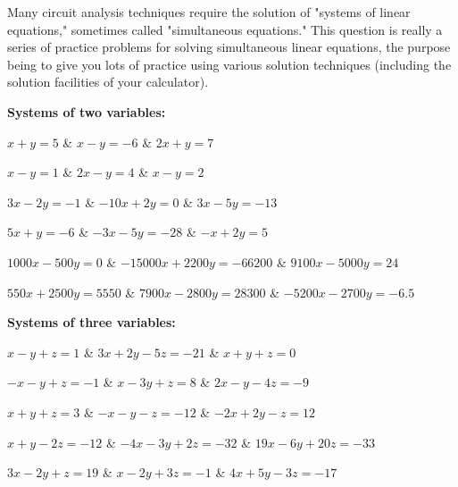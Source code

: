 

Many circuit analysis techniques require the solution of "systems of linear equations," sometimes called "simultaneous equations."  This question is really a series of practice problems for solving simultaneous linear equations, the purpose being to give you lots of practice using various solution techniques (including the solution facilities of your calculator).

\vskip 10pt

\noindent
{\bf Systems of two variables:}

\vskip 5pt

 \columns
\+ $x + y = 5$  &
$x - y = -6$  &
$2x + y = 7$ \cr

 \columns
\+ $x - y = 1$  &
$2x - y = 4$  &
$x - y = 2$ \cr

\vskip 20pt

 \columns
\+ $3x - 2y = -1$  &
$-10x + 2y = 0$  &
$3x - 5y = -13$ \cr

 \columns
\+ $5x + y = -6$  &
$-3x - 5y = -28$  &
$-x + 2y = 5$ \cr

\vskip 20pt

 \columns
\+ $1000x - 500y = 0$  &
$-15000x + 2200y = -66200$  &
$9100x - 5000y = 24$ \cr

 \columns
\+ $550x + 2500y = 5550$  &
$7900x - 2800y = 28300$  &
$-5200x - 2700y = -6.5$ \cr

\vskip 20pt

\noindent
{\bf Systems of three variables:}

\vskip 5pt

 \columns
\+ $x - y + z = 1$  &
$3x + 2y - 5z = -21$  &
$x + y + z = 0$ \cr

 \columns
\+ $-x - y + z = -1$  &
$x - 3y + z = 8$  &
$2x - y - 4z = -9$ \cr

 \columns
\+ $x + y + z = 3$  &
$-x - y - z = -12 $  &
$-2x + 2y - z = 12$ \cr

\vskip 20pt

 \columns
\+ $x + y - 2z = -12$  &
$-4x - 3y + 2z = -32$  &
$19x - 6y + 20z = -33$ \cr

 \columns
\+ $3x - 2y + z = 19$  &
$x - 2y + 3z = -1$  &
$4x + 5y - 3z = -17$ \cr

